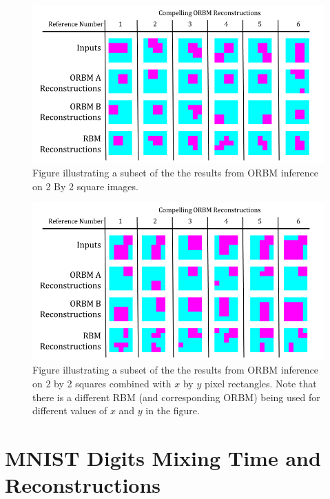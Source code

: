 \begin{figure}[htb]
  \begin{center}
    \includegraphics[width=\textwidth]{Assets/results/sq-orbm-results.png}
  \end{center}
  \caption{Figure illustrating a subset of the the results from ORBM inference on 2 By 2 square images.}
  \label{F:sq-orbm-results}
\end{figure}

\begin{figure}[htb]
  \begin{center}
    \includegraphics[width=\textwidth]{Assets/results/rect-sq-orbm-results.png}
  \end{center}
  \caption{Figure illustrating a subset of the the results from ORBM inference on 2 by 2 squares combined with $x$ by $y$ pixel rectangles. Note that there is a different RBM (and corresponding ORBM) being used for different values of $x$ and $y$ in the figure.}
  \label{F:rect-orbm-results}
\end{figure}


  \section{MNIST Digits Mixing Time and Reconstructions}

